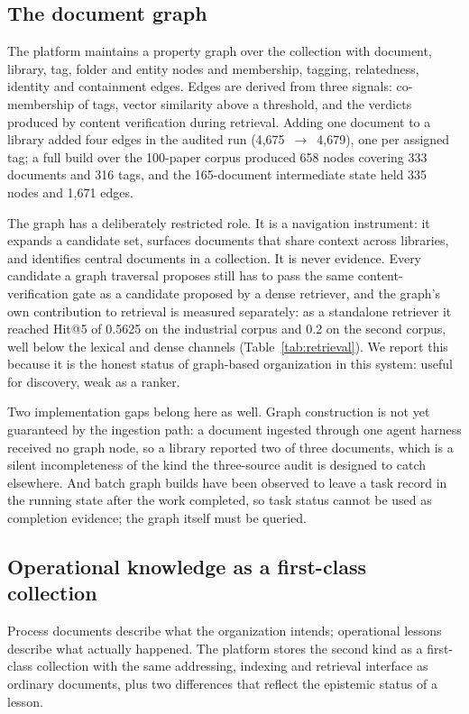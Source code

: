 \subsection{The document graph}
\label{sec:org-graph}

The platform maintains a property graph over the collection with document,
library, tag, folder and entity nodes and membership, tagging, relatedness,
identity and containment edges. Edges are derived from three signals:
co-membership of tags, vector similarity above a threshold, and the verdicts
produced by content verification during retrieval. Adding one document to a
library added four edges in the audited run (4{,}675~$\rightarrow$~4{,}679),
one per assigned tag; a full build over the 100-paper corpus produced 658
nodes covering 333 documents and 316 tags, and the 165-document intermediate
state held 335 nodes and 1{,}671 edges.

The graph has a deliberately restricted role. It is a navigation instrument:
it expands a candidate set, surfaces documents that share context across
libraries, and identifies central documents in a collection. It is never
evidence. Every candidate a graph traversal proposes still has to pass the
same content-verification gate as a candidate proposed by a dense retriever,
and the graph's own contribution to retrieval is measured separately: as a
standalone retriever it reached Hit@5 of 0.5625 on the industrial corpus and
0.2 on the second corpus, well below the lexical and dense channels
(Table~\ref{tab:retrieval}). We report this because it is the honest status
of graph-based organization in this system: useful for discovery, weak as a
ranker.

Two implementation gaps belong here as well. Graph construction is not yet
guaranteed by the ingestion path: a document ingested through one agent
harness received no graph node, so a library reported two of three
documents, which is a silent incompleteness of the kind the three-source
audit is designed to catch elsewhere. And batch graph builds have been
observed to leave a task record in the running state after the work
completed, so task status cannot be used as completion evidence; the graph
itself must be queried.

\subsection{Operational knowledge as a first-class collection}
\label{sec:org-experience}

Process documents describe what the organization intends; operational
lessons describe what actually happened. The platform stores the second kind
as a first-class collection with the same addressing, indexing and retrieval
interface as ordinary documents, plus two differences that reflect the
epistemic status of a lesson.

